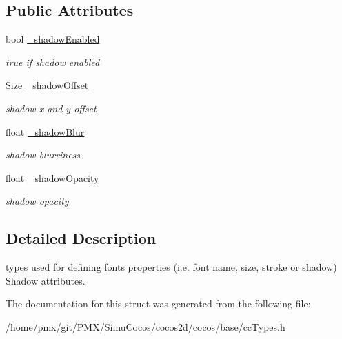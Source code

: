 \subsection*{Public Attributes}
\begin{DoxyCompactItemize}
\item 
\mbox{\label{structFontShadow_a58a1b2d682df665cd98df1d8e3167ee6}} 
bool \hyperlink{structFontShadow_a58a1b2d682df665cd98df1d8e3167ee6}{\+\_\+shadow\+Enabled}
\begin{DoxyCompactList}\small\item\em true if shadow enabled \end{DoxyCompactList}\item 
\mbox{\label{structFontShadow_a4bbc4f8a5486f7e7ad4b855a8f8e66a1}} 
\hyperlink{classSize}{Size} \hyperlink{structFontShadow_a4bbc4f8a5486f7e7ad4b855a8f8e66a1}{\+\_\+shadow\+Offset}
\begin{DoxyCompactList}\small\item\em shadow x and y offset \end{DoxyCompactList}\item 
\mbox{\label{structFontShadow_a7a3dc2a4184ae1856905effb743038be}} 
float \hyperlink{structFontShadow_a7a3dc2a4184ae1856905effb743038be}{\+\_\+shadow\+Blur}
\begin{DoxyCompactList}\small\item\em shadow blurriness \end{DoxyCompactList}\item 
\mbox{\label{structFontShadow_adc375ba84abda80c5bdb3dbd770b4ab0}} 
float \hyperlink{structFontShadow_adc375ba84abda80c5bdb3dbd770b4ab0}{\+\_\+shadow\+Opacity}
\begin{DoxyCompactList}\small\item\em shadow opacity \end{DoxyCompactList}\end{DoxyCompactItemize}


\subsection{Detailed Description}
types used for defining fonts properties (i.\+e. font name, size, stroke or shadow) Shadow attributes. 

The documentation for this struct was generated from the following file\+:\begin{DoxyCompactItemize}
\item 
/home/pmx/git/\+P\+M\+X/\+Simu\+Cocos/cocos2d/cocos/base/cc\+Types.\+h\end{DoxyCompactItemize}
